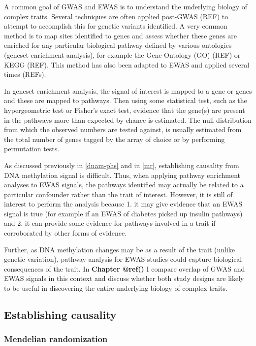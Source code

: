 \documentclass[11pt,twoside]{bristolthesis}
\begin{document}
A common goal of GWAS and EWAS is to understand the underlying biology of complex traits. Several techniques are often applied post-GWAS (REF) to attempt to accomplish this for genetic variants identified. A very common method is to map sites identified to genes and assess whether these genes are enriched for any particular biological pathway defined by various ontologies (geneset enrichment analysis), for example the Gene Ontology (GO) (REF) or KEGG (REF). This method has also been adapted to EWAS and applied several times (REFs).

In geneset enrichment analysis, the signal of interest is mapped to a gene or genes and these are mapped to pathways. Then using some statistical test, such as the hypergeometric test or Fisher's exact test, evidence that the gene(s) are present in the pathways more than expected by chance is estimated. The null distribution from which the observed numbers are tested against, is usually estimated from the total number of genes tagged by the array of choice or by performing permutation tests.

As discussed previously in \ref{dnam-phs} and in \ref{mr}, establishing causality from DNA methylation signal is difficult. Thus, when applying pathway enrichment analyses to EWAS signals, the pathways identified may actually be related to a particular confounder rather than the trait of interest. However, it is still of interest to perform the analysis because 1. it may give evidence that an EWAS signal is true (for example if an EWAS of diabetes picked up insulin pathways) and 2. it can provide some evidence for pathways involved in a trait if corroborated by other forms of evidence.

Further, as DNA methylation changes may be as a result of the trait (unlike genetic variation), pathway analysis for EWAS studies could capture biological consequences of the trait. In \textbf{Chapter @ref()} I compare overlap of GWAS and EWAS signals in this context and discuss whether both study designs are likely to be useful in discovering the entire underlying biology of complex traits.

\hypertarget{establishing-causality}{%
\subsection{Establishing causality}\label{establishing-causality}}

\hypertarget{mendelian-randomization}{%
\subsubsection{Mendelian randomization}\label{mendelian-randomization}}
\end{document}
